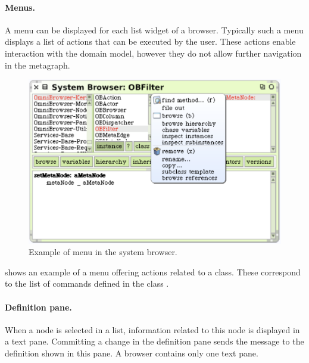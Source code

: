 \documentclass[a4paper,10pt,twoside]{book}
\begin{document}
\paragraph{Menus.} A menu can be displayed for each list widget of a browser. Typically such a menu displays a list of actions that can be executed by the user. These actions enable interaction with the domain model, however they do not allow further navigation in the metagraph.

\begin{figure}[!ht]
\begin{center}
\includegraphics[scale=0.65]{menu.pdf}
\caption{Example of menu in the \obf system browser.} 
\end{center}
\end{figure}

 shows an example of a menu offering actions related to a class. These correspond to the list of commands defined in the class .

\paragraph{Definition pane.} When a node is selected in a list, information related to this node is displayed in a text pane. Committing a change in the definition pane sends the message  to the definition shown in this pane. A browser contains only one text pane.

\end{document}
